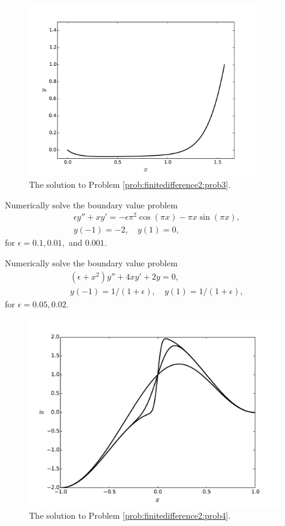 \begin{figure}[h]
\centering
\includegraphics[width=10cm]{figure3.pdf}
\caption{The solution to Problem \ref{prob:finitedifference2:prob3}.
}
\end{figure}

\begin{problem}
Numerically solve the boundary value problem
\begin{align*}
	\epsilon y'' + xy' = -\epsilon \pi^2 \cos(\pi x) - \pi x \sin(\pi x), \\
	y(-1) = -2, \quad y(1) = 0,
\end{align*}
for $\epsilon = 0.1, 0.01,$ and $0.001$.
\label{prob:finitedifference2:prob4}
\end{problem}

\begin{problem}
Numerically solve the boundary value problem
\begin{align*}
	(\epsilon +x^2)y'' + 4xy' + 2y = 0, \\
	y(-1) = 1/(1+\epsilon), \quad y(1) = 1/(1+\epsilon),
\end{align*}
for $\epsilon = 0.05, 0.02$.
\label{prob:finitedifference2:prob5}
\end{problem}

\begin{figure}[h]
\centering
\includegraphics[width=11cm]{figure4.pdf}
\caption{The solution to Problem \ref{prob:finitedifference2:prob4}.
}
\end{figure}

